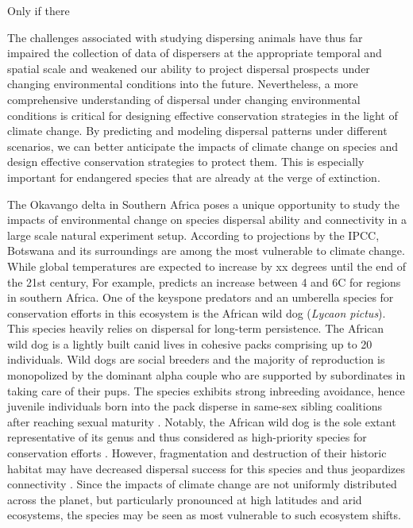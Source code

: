 \documentclass[abstract=on,10pt,a4paper,bibliography=totocnumbered]{article}
\begin{document}
Only if there

The challenges associated with studying dispersing animals have thus far
impaired the collection of data of dispersers at the appropriate temporal and
spatial scale \citep{Graves.2014, Vasudev.2015} and weakened our ability to
project dispersal prospects under changing environmental conditions into the
future. Nevertheless, a more comprehensive understanding of dispersal under
changing environmental conditions is critical for designing effective
conservation strategies in the light of climate change. By predicting and
modeling dispersal patterns under different scenarios, we can better anticipate
the impacts of climate change on species and design effective conservation
strategies to protect them. This is especially important for endangered species
that are already at the verge of extinction.

The Okavango delta in Southern Africa poses a unique opportunity to study the
impacts of environmental change on species dispersal ability and connectivity in
a large scale natural experiment setup. According to projections by the IPCC,
Botswana and its surroundings are among the most vulnerable to climate change.
While global temperatures are expected to increase by xx degrees until the end
of the 21st century, For example, \cite{Engelbrecht.2015} predicts an increase
between 4 and 6\degree C for regions in southern Africa. One of the keyspone
predators and an umberella species for conservation efforts in this ecosystem is
the African wild dog (\textit{Lycaon pictus}). This species heavily relies on
dispersal for long-term persistence. The African wild dog is a lightly built
canid lives in cohesive packs comprising up to 20 individuals. Wild dogs are
social breeders and the majority of reproduction is monopolized by the dominant
alpha couple who are supported by subordinates in taking care of their pups. The
species exhibits strong inbreeding avoidance, hence juvenile individuals born
into the pack disperse in same-sex sibling coalitions after reaching sexual
maturity \citep{McNutt.1996, Behr.2020}. Notably, the African wild dog is the
sole extant representative of its genus and thus considered as high-priority
species for conservation efforts \citep{Leigh.2012}. However, fragmentation and
destruction of their historic habitat may have decreased dispersal success for
this species and thus jeopardizes connectivity \citep{Leigh.2012}. Since the
impacts of climate change are not uniformly distributed across the planet, but
particularly pronounced at high latitudes and arid ecosystems, the species may
be seen as most vulnerable to such ecosystem shifts.
\end{document}
